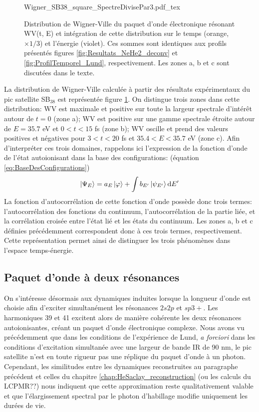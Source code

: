 \begin{figure}[h]
\centering
\def\svgwidth{\textwidth}
{Wigner_SB38_square_SpectreDivisePar3.pdf_tex}
\caption{Distribution de Wigner-Ville du paquet d'onde électronique résonant WV(t, E) et intégration de cette distribution sur le temps (orange, $\times 1/3$) et l'énergie (violet). Ces sommes sont identiques aux profils présentés figures \ref{fig:Resultats_NeHe2_deconv} et \ref{fig:ProfilTemporel_Lund}, respectivement. Les zones a, b et c sont discutées dans le texte.}
\label{fig:Wigner_SB38}
\end{figure}

La distribution de Wigner-Ville calculée à partir des résultats expérimentaux du pic satellite SB$_{38}$ est représentée figure \ref{fig:Wigner_SB38}. On distingue trois zones dans cette distribution: WV est maximale et positive sur toute la largeur spectrale d'intérêt autour de $t = 0$ (zone a); WV est positive sur une gamme spectrale étroite autour de $E = 35.7$ eV et $0 < t < 15$ fs (zone b); WV oscille et prend des valeurs positives et négatives pour $3 < t < 20$ fs et $35.4 < E < 35.7$ eV (zone c). Afin d'interpréter ces trois domaines, rappelons ici l'expression de la fonction d'onde de l'état autoionisant dans la base des configurations: (équation \ref{eq:BaseDesConfigurations})
\begin{equation}
\ket{\Psi_E} = a_E \ket{\varphi} + \int b_{E'} \ket{\psi_{E'}} \mathrm{d} E'
\end{equation}
La fonction d'autocorrélation de cette fonction d'onde possède donc trois termes:  l'autocorrélation des fonctions du continuum, l'autocorrélation de la partie liée, et la corrélation croisée entre l'état lié et les états du continuum. Les zones a, b et c définies précédemment correspondent donc à ces trois termes, respectivement. Cette représentation permet ainsi de distinguer les trois phénomènes dans l'espace temps-énergie.


\subsection{Paquet d'onde à deux résonances}
\label{subsec:Lund2resonances}
On s'intéresse désormais aux dynamiques induites lorsque la longueur d'onde est choisie afin d'exciter simultanément les résonances $2s2p$ et $sp3+$. Les harmoniques 39 et 41 excitent alors de manière cohérente les deux résonances autoionisantes, créant un paquet d'onde électronique complexe. Nous avons vu précédemment que dans les conditions de l'expérience de Lund, \textit{a forciori} dans les conditions d'excitation simultanée avec une largeur de bande IR de 90 nm, le pic satellite n'est en toute rigueur pas une réplique du paquet d'onde à un photon. Cependant, les similitudes entre les dynamiques reconstruites au paragraphe précédent et celles du chapitre \ref{chap:HeSaclay_reconstruction} (ou les calculs du LCPMR??) nous indiquent que cette approximation reste qualitativement valable et que l'élargissement spectral par le photon d'habillage modifie uniquement les durées de vie.

